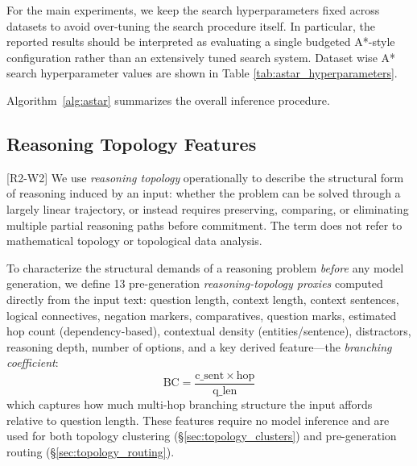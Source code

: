 \documentclass[11pt]{article}
\begin{document}

For the main experiments, we keep the search hyperparameters fixed across datasets to avoid over-tuning the search procedure itself. In particular, the reported results should be interpreted as evaluating a single budgeted A*-style configuration rather than an extensively tuned search system. Dataset wise A* search hyperparameter values are shown in Table \ref{tab:astar_hyperparameters}.

Algorithm~\ref{alg:astar} summarizes the overall inference procedure.



\subsection{Reasoning Topology Features}
\label{sec:topology_features}

\textcolor{reviewerblue}{[R2-W2] We use \emph{reasoning topology} operationally to describe the structural form of reasoning induced by an input: whether the problem can be solved through a largely linear trajectory, or instead requires preserving, comparing, or eliminating multiple partial reasoning paths before commitment. The term does not refer to mathematical topology or topological data analysis.}

To characterize the structural demands of a reasoning problem \emph{before} any model generation, we define 13 pre-generation \textcolor{reviewerblue}{\emph{reasoning-topology proxies}} computed directly from the input text: question length, context length, context sentences, logical connectives, negation markers, comparatives, question marks, estimated hop count (dependency-based), contextual density (entities/sentence), distractors, reasoning depth, number of options, and a key derived feature---the \emph{branching coefficient}:
\textcolor{reviewerblue}{
\begin{equation}
\mathrm{BC} = \frac{\mathrm{c\_sent} \times \mathrm{hop}}{\mathrm{q\_len}}
\label{eq:branching_coefficient}
\end{equation}}
which captures how much multi-hop branching structure the input affords relative to question length. These features require no model inference and are used for both topology clustering (\S\ref{sec:topology_clusters}) and pre-generation routing (\S\ref{sec:topology_routing}).
\end{document}

